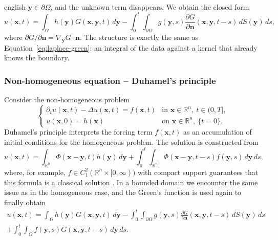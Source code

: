 \documentclass[0000.tex]{subfiles}
\begin{document}
\begin{hyphenrules}{english}
$\mathbf{y}\in\partial\Omega$, and the unknown term disappears. We obtain the closed form
\begin{equation}
  u(\mathbf{x},t)=\int_\Omega h(\mathbf{y})G(\mathbf{x},\mathbf{y},t)\,d\mathbf{y}
  -\int_0^t\!\!\int_{\partial\Omega}g(\mathbf{y},s)\frac{\partial G}{\partial\mathbf{n}}(\mathbf{x},\mathbf{y},t-s)\,d S(\mathbf{y})\,d s,
  \label{eq:heat-green}
\end{equation}
where $\partial G/\partial\mathbf{n}=\nabla_{\mathbf{y}}G\cdot\mathbf{n}$. The structure is exactly the same as
Equation~\eqref{eq:laplace-green}: an integral of the data against a kernel that already knows the boundary.

\subsubsection{Non-homogeneous equation -- Duhamel's principle}
Consider the non-homogeneous problem
\begin{equation}
  \begin{cases}
    \partial_t u(\mathbf{x},t)-\Delta u(\mathbf{x},t)=f(\mathbf{x},t) & \text{in } \mathbf{x}\in\mathbb{R}^n,\ t\in(0,T],\\
    u(\mathbf{x},0)=h(\mathbf{x}) & \text{on } \mathbf{x}\in\mathbb{R}^n,\ \{t=0\}.
  \end{cases}
  \label{eq:heat-nonhom}
\end{equation}
Duhamel's principle interprets the forcing term $f(\mathbf{x},t)$ as an accumulation of initial conditions for
the homogeneous problem. The solution is constructed from
\begin{equation}
  u(\mathbf{x},t)=\int_{\mathbb{R}^n}\Phi(\mathbf{x}-\mathbf{y},t)h(\mathbf{y})\,d\mathbf{y}+\int_0^t\!\!\int_{\mathbb{R}^n}\Phi(\mathbf{x}-\mathbf{y},t-s)f(\mathbf{y},s)\,d\mathbf{y}\,d s,
  \label{eq:heat-duhamel}
\end{equation}
where, for example, $f\in C_1^2(\mathbb{R}^n\times[0,\infty))$ with compact support guarantees that this
formula is a classical solution \cite{evans2010}. In a bounded domain we encounter the same issue
as in the homogeneous case, and the Green's function is used again to finally obtain
\begin{multline}
  u(\mathbf{x},t)=\int_\Omega h(\mathbf{y})G(\mathbf{x},\mathbf{y},t)\,d\mathbf{y}
  -\int_0^t\!\!\int_{\partial\Omega}g(\mathbf{y},s)\frac{\partial G}{\partial\mathbf{n}}(\mathbf{x},\mathbf{y},t-s)\,d S(\mathbf{y})\,d s\\
  +\int_0^t\!\!\int_\Omega f(\mathbf{y},s)G(\mathbf{x},\mathbf{y},t-s)\,d\mathbf{y}\,d s.
  \label{eq:heat-green-full}
\end{multline}


\end{hyphenrules}
\end{document}
